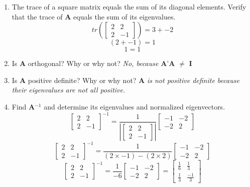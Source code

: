 \documentclass[12pt,a4paper]{paper}
\begin{document}
\begin{enumerate}
\begin{enumerate}
\item The trace of a square matrix equals the sum of its diagonal elements. Verify that the
trace of \textbf{A} equals the sum of its eigenvalues.
\begin{equation}
tr\left(\left[\begin{array}{cc}2 & 2 \\ 2 & -1\end{array}\right]\right) = 3 + -2
\end{equation}
\begin{equation}
(2 + -1) = 1
\end{equation}
\begin{equation}
1 = 1
\end{equation}
\item Is \textbf{A} orthogonal? Why or why not? \emph{No, because} \textbf{A}'\textbf{A} $\neq$ \textbf{I}
\item Is \textbf{A} positive definite? Why or why not? \textbf{A} \emph{is not positive definite because their eigenvalues are not all positive.}
\item Find \textbf{A}$^{-1}$ and determine its eigenvalues and normalized eigenvectors.
\begin{equation}
\left[\begin{array}{cc}2 & 2 \\ 2 & -1\end{array}\right]^{-1} = \frac{1}{\left|\left[\begin{array}{cc}2 & 2 \\ 2 & -1\end{array}\right]\right|}\left[\begin{array}{cc}-1 & -2 \\ -2 & 2\end{array}\right]
\end{equation}
\begin{equation}
\left[\begin{array}{cc}2 & 2 \\ 2 & -1\end{array}\right]^{-1} = \frac{1}{\left(2 \times -1\right)-\left(2 \times 2\right)}\left[\begin{array}{cc}-1 & -2 \\ -2 & 2\end{array}\right]
\end{equation}
\begin{equation}
\left[\begin{array}{cc}2 & 2 \\ 2 & -1\end{array}\right]^{-1} = \frac{1}{-6}\left[\begin{array}{cc}-1 & -2 \\ -2 & 2\end{array}\right] = \left[\begin{array}{cc}\frac{1}{6} & \frac{1}{3} \\ \frac{1}{3} & \frac{-1}{3}\end{array}\right]

\end{equation}
\end{enumerate}
\end{enumerate}
\end{document}

